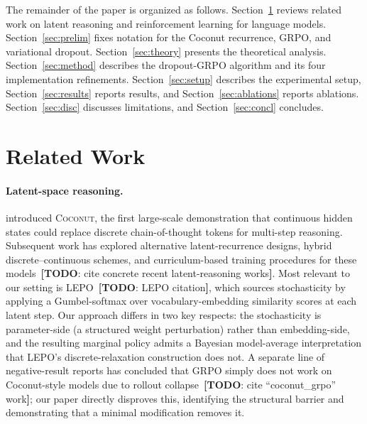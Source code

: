 \documentclass[11pt]{article}
\theoremstyle{definition}
\theoremstyle{remark}
\newcommand{\answerTODO}[1][]{{\color{red}\textbf{[TODO}#1\textbf{]}}}
\begin{document}
The remainder of the paper is organized as follows.
Section~\ref{sec:related} reviews related work on latent reasoning and
reinforcement learning for language models.
Section~\ref{sec:prelim} fixes notation for the Coconut recurrence,
GRPO, and variational dropout.  Section~\ref{sec:theory} presents the
theoretical analysis.  Section~\ref{sec:method} describes the
dropout-GRPO algorithm and its four implementation refinements.
Section~\ref{sec:setup} describes the experimental setup,
Section~\ref{sec:results} reports results, and
Section~\ref{sec:ablations} reports ablations.  Section~\ref{sec:disc}
discusses limitations, and Section~\ref{sec:concl} concludes.

\section{Related Work}
\label{sec:related}

\paragraph{Latent-space reasoning.}
\citet{hao2024coconut} introduced \textsc{Coconut}, the first
large-scale demonstration that continuous hidden states could replace
discrete chain-of-thought tokens for multi-step reasoning.  Subsequent
work has explored alternative latent-recurrence designs, hybrid
discrete--continuous schemes, and curriculum-based training procedures
for these models~\answerTODO[: cite concrete recent latent-reasoning works].
Most relevant to our setting is \textsc{LEPO}~\answerTODO[: LEPO citation],
which sources stochasticity by applying a Gumbel-softmax over
vocabulary-embedding similarity scores at each latent step.  Our
approach differs in two key respects: the stochasticity is
parameter-side (a structured weight perturbation) rather than
embedding-side, and the resulting marginal policy admits a
Bayesian model-average interpretation that LEPO's discrete-relaxation
construction does not.  A separate line of negative-result reports has
concluded that GRPO simply does not work on Coconut-style models due
to rollout collapse~\answerTODO[: cite ``coconut\_grpo'' work];
our paper directly disproves this, identifying the structural barrier
and demonstrating that a minimal modification removes it.
\end{document}
